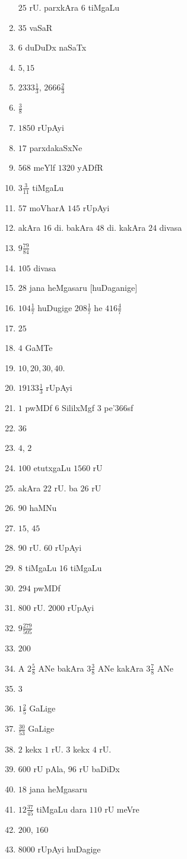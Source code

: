 \begin{multicols}{2}
\begin{enumerate}[$(1)$]
      $25$ rU. parxkAra $6$ tiMgaLu
\item $35$ vaSaR 
\item $6$ duDuDx naSaTx
\item $5, 15$
\item $2333\frac{1}{3}$, $2666\frac{2}{3}$
\item $\frac{3}{8}$
\item $1850$ rUpAyi
\item $17$ parxdakaSxNe
\item $568$ meYlf $1320$ yADfR
\item $3\frac{3}{11}$ tiMgaLu
\item $57$ moVharA $145$ rUpAyi
\item akAra $16$ di. bakAra $48$ di. kakAra $24$ divasa
\item $9 \frac{79}{84}$
\item $105$ divasa
\item $28$ jana heMgasaru [huDaganige]
\item $104 \frac{1}{7}$ huDugige $208 \frac{1}{7}$ he
$416 \frac{4}{7}$
\item $25$
\item $4$ GaMTe
\item $10, 20, 30, 40$.
\item $19133\frac{1}{3}$ rUpAyi
\item $1$ pwMDf $6$ SililxMgf $3$ pe\char'366sf
\item $36$
\item $4$, $2$
\item $100$ etutxgaLu $1560$ rU
\item akAra $22$ rU. ba $26$ rU
\item $90$ haMNu
\item $15$, $45$
\item $90$ rU. $60$ rUpAyi
\item $8$ tiMgaLu $16$ tiMgaLu
\item $294$ pwMDf
\item $800$ rU. $2000$ rUpAyi
\item $9\frac{279}{505}$
\item $200$
\item A $2\frac{5}{8}$ ANe bakAra $3\frac{3}{8}$ ANe kakAra
$3\frac{7}{8}$ ANe
\item $3$
\item $1\frac{2}{5}$ GaLige
\item $\frac{30}{53}$ GaLige
\item $2$ kekx $1$ rU. $3$ kekx $4$ rU.
\item $600$ rU pAla, $96$ rU baDiDx
\item $18$ jana heMgasaru
\item $12\frac{37}{45}$ tiMgaLu dara $110$ rU meVre
\item $200$, $160$
\item $8000$ rUpAyi huDagige 


\end{enumerate}
\end{multicols}
